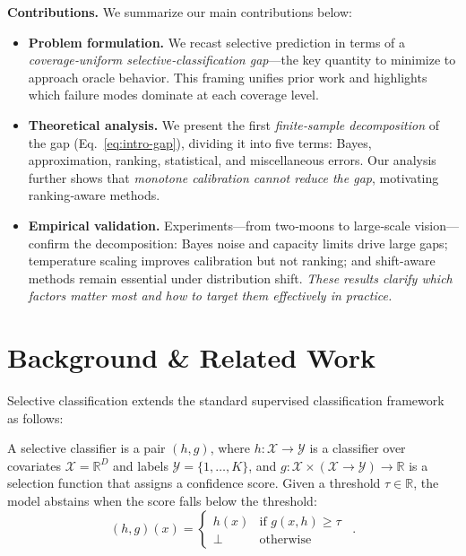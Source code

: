 \textbf{Contributions.}
We summarize our main contributions below:
\begin{itemize}
    \item \textbf{Problem formulation.}  
          We recast selective prediction in terms of a \emph{coverage‑uniform selective‑classification gap}—the key quantity to minimize to approach oracle behavior.  
This framing unifies prior work and highlights which failure modes dominate at each coverage level.

    \item \textbf{Theoretical analysis.}  
          We present the first \emph{finite‑sample decomposition} of the gap (Eq.~\eqref{eq:intro-gap}), dividing it into five terms: Bayes, approximation, ranking, statistical, and miscellaneous errors.  
Our analysis further shows that \emph{monotone calibration cannot reduce the gap}, motivating ranking‑aware methods.

\item \textbf{Empirical validation.}  
      Experiments—from two‑moons to large‑scale vision—confirm the decomposition: Bayes noise and capacity limits drive large gaps; temperature scaling improves calibration but not ranking; and shift-aware methods remain essential under distribution shift. \emph{These results clarify which factors matter most and how to target them effectively in practice.}
\end{itemize}

\section{Background \& Related Work}
\label{sec:background}

Selective classification extends the standard supervised classification framework as follows:

\begin{definition}
A selective classifier is a pair \( (h, g) \), where \( h: \mathcal{X} \to \mathcal{Y} \) is a classifier over covariates \( \mathcal{X} = \mathbb{R}^D \) and labels \( \mathcal{Y} = \{1, \ldots, K\} \), and \( g: \mathcal{X} \times (\mathcal{X} \to \mathcal{Y}) \to \mathbb{R} \) is a selection function that assigns a confidence score.  
Given a threshold \( \tau \in \mathbb{R} \), the model abstains when the score falls below the threshold:
\begin{equation}
    \label{eq:sel_class}
    (h, g)(x) = \begin{cases}
    h(x) & \text{if } g(x, h) \geq \tau \\
    \bot & \text{otherwise}
    \end{cases}
    \enspace .
\end{equation}
\end{definition}

